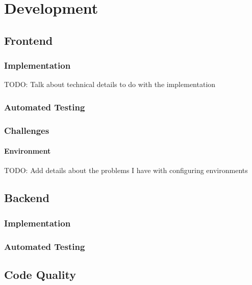 \chapter{Development}
\label{cha:development}

\section{Frontend}
\subsection{Implementation}
TODO: Talk about technical details to do with the implementation
\subsection{Automated Testing}
\subsection{Challenges}
\subsubsection{Environment}
TODO: Add details about the problems I have with configuring environments

\section{Backend}
\subsection{Implementation}
\subsection{Automated Testing}

\section{Code Quality} \label{sec:code-quality}

